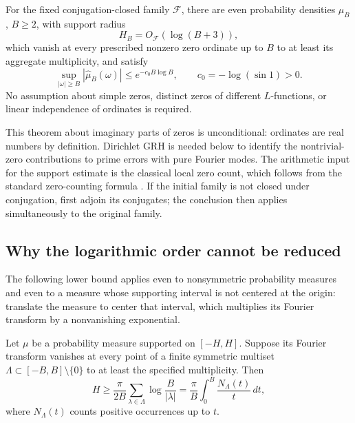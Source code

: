\begin{theorem}
\label{thm:dirichlet-filter}
For the fixed conjugation-closed family $\mathcal F$, there are even probability densities $\mu_B$, $B\ge2$, with support radius
\[
 H_B=O_{\mathcal F}(\log(B+3)),
\]
which vanish at every prescribed nonzero zero ordinate up to $B$
to at least its aggregate multiplicity, and satisfy
\[
 \sup_{|\omega|\ge B}|\widehat\mu_B(\omega)|
 \le e^{-c_0B\log B},\qquad c_0=-\log(\sin1)>0.
\]
No assumption about simple zeros, distinct zeros of different
$L$-functions, or linear independence of ordinates is required.
\end{theorem}

This theorem about imaginary parts of zeros is unconditional: ordinates
are real numbers by definition. Dirichlet GRH is needed below to identify
the nontrivial-zero contributions to prime errors with pure Fourier modes.
The arithmetic input for the support estimate is the classical local zero
count, which follows from the standard zero-counting formula \cite{Davenport}. If the initial family is not closed
under conjugation, first adjoin its conjugates; the conclusion then
applies simultaneously to the original family.

\subsection{Why the logarithmic order cannot be reduced}

The following lower bound applies even to nonsymmetric probability
measures and even to a measure whose supporting interval is not
centered at the origin: translate the measure to center that interval,
which multiplies its Fourier transform by a nonvanishing exponential.

\begin{lemma}\label{lem:jensen-support}
Let $\mu$ be a probability measure supported on $[-H,H]$. Suppose its
Fourier transform vanishes at every point of a finite symmetric
multiset $\Lambda\subset[-B,B]\setminus\{0\}$ to at least the
specified multiplicity. Then
\begin{equation}\label{eq:jensen-support}
 H\ge\frac{\pi}{2B}
       \sum_{\lambda\in\Lambda}\log\frac{B}{|\lambda|}
  =\frac\pi B\int_0^B\frac{N_\Lambda(t)}t\,dt,
\end{equation}
where $N_\Lambda(t)$ counts positive occurrences up to $t$.
\end{lemma}

